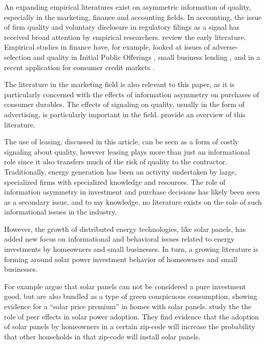 \documentclass[a4paper]{article}
\begin{document}
An expanding empirical literatures exist on asymmetric information of quality, especially in the marketing, finance and accounting fields. In accounting, the issue of firm quality and voluntary disclosure in regulatory filings as a signal has received broad attention by empirical researchers. \citet{healy_information_2001} review the early literature. Empirical studies in finance have, for example, looked at issues of adverse-selection and quality in Initial Public Offerings \citep{michaely_pricing_1994}, small business lending \citep{petersen_benefits_1994}, and in a recent application for consumer credit markets \citep{dobbie_information_2013}.

The literature in the marketing field is also relevant to this paper, as it is particularly concerned with the effects of information asymmetry on purchases of consumer durables. The effects of signaling on quality, usually in the form of advertising, is particularly important in the field. \citet{kirmani_no_2000} provide an overview of this literature.

The use of leasing, discussed in this article, can be seen as a form of costly signaling about quality, however leasing plays more than just an informational role since it also transfers much of the risk of quality to the contractor. Traditionally, energy generation has been an activity undertaken by large, specialized firms with specialized knowledge and resources. The role of information asymmetry in investment and purchase decisions has likely been seen as a secondary issue, and to my knowledge, no literature exists on the role of such informational issues in the industry.

However, the growth of distributed energy technologies, like solar panels, has added new focus on informational and behavioral issues related to energy investments by homeowners and small businesses. In turn, a growing literature is forming around solar power investment behavior of homeowners and small businesses.

For example \citet{dastrup_understanding_2012} argue that solar panels can not be considered a pure investment good, but are also bundled as a type of green conspicuous consumption, showing evidence for a ``solar price premium'' in homes with solar panels. \citet{bollinger_peer_2012} study the the role of peer effects in solar power adoption. They find evidence that the adoption of solar panels by homeowners in a certain zip-code will increase the probability that other households in that zip-code will install solar panels.
\end{document}
